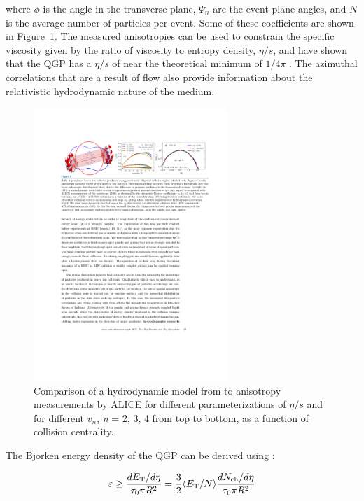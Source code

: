 where $\phi$ is the angle in the transverse plane, $\Psi_n$ are the event plane angles, and $N$ is the average number of particles per event. Some of these coefficients are shown in 
Figure~\ref{fig:flow_coeff}. The measured anisotropies can be used to constrain the specific viscosity given by the ratio of viscosity to entropy density, $\eta / s$, and have shown that 
the QGP has a $\eta / s$ of near the theoretical minimum of $1/4\pi$ \cite{Heinz:2013th}. The azimuthal correlations that are a result of flow also provide information about the relativistic 
hydrodynamic nature of the medium. 


\begin{figure}[htbp]
\begin{center}
\includegraphics[width=0.65\textwidth]{figures/theory/flow_coefficients}
\caption{Comparison of a hydrodynamic model from \cite{Niemi:2015qia} to anisotropy measurements by ALICE \cite{ALICE:2011ab} for different parameterizations of $\eta / s $ and for different $v_n$, {\it{n}} = 2, 3, 4 from top to bottom, as a function of collision centrality.}
\label{fig:flow_coeff}
\end{center}
\end{figure}

The Bjorken energy density of the QGP can be derived using \cite{PhysRevD.27.140}:

\begin{align}
\varepsilon \geq \frac{d\mbox{$E_{\mathrm{T}}$}/d\eta}{\tau_0 \pi R^2} = \frac{3}{2} \langle \mbox{$E_{\mathrm{T}}$}/N \rangle \frac{d\mbox{$N_{\mathrm{ch}}$}/d\eta}{\tau_0 \pi R^2}
\end{align}

